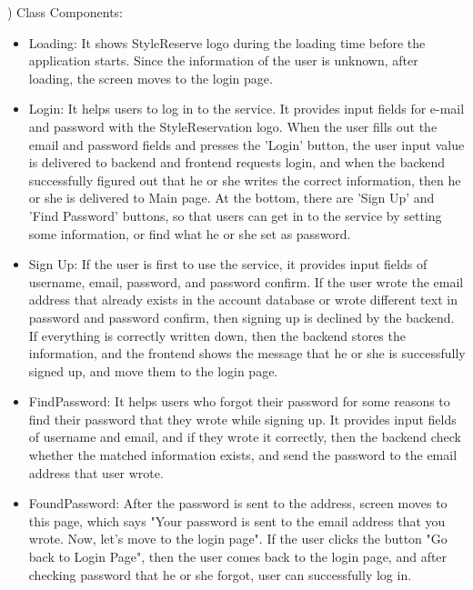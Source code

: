 \documentclass[conference]{IEEEtran}
\begin{document}
) Class Components:
\begin{itemize}
    \item Loading: It shows StyleReserve logo during the loading time before the application starts. Since the information of the user is unknown, after loading, the screen moves to the login page.\\
    
    \item Login: It helps users to log in to the service. It provides input fields for e-mail and password with the StyleReservation logo. When the user fills out the email and password fields and presses the ’Login’ button, the user input value is delivered to backend and frontend requests login, and when the backend successfully figured out that he or she writes the correct information, then he or she is delivered to Main page. At the bottom, there are 'Sign Up' and 'Find Password' buttons, so that users can get in to the service by setting some information, or find what he or she set as password.\\
    
    \item Sign Up: If the user is first to use the service, it provides input fields of username, email, password, and password confirm. If the user wrote the email address that already exists in the account database or wrote different text in password and password confirm, then signing up is declined by the backend. If everything is correctly written down, then the backend stores the information, and the frontend shows the message that he or she is successfully signed up, and move them to the login page.\\
    
    \item FindPassword: It helps users who forgot their password for some reasons to find their password that they wrote while signing up. It provides input fields of username and email, and if they wrote it correctly, then the backend check whether the matched information exists, and send the password to the email address that user wrote.\\
    
    \item FoundPassword: After the password is sent to the address, screen moves to this page, which says "Your password is sent to the email address that you wrote. Now, let's move to the login page". If the user clicks the button "Go back to Login Page", then the user comes back to the login page, and after checking password that he or she forgot, user can successfully log in.\\
    

\end{itemize}
\end{document}
